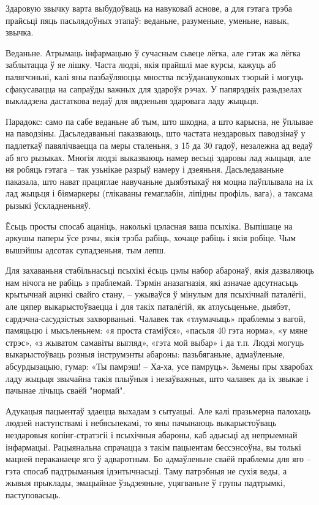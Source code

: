 Здаровую звычку варта выбудоўваць на навуковай аснове, а для гэтага трэба прайсьці пяць пасьлядоўных этапаў: веданьне, разуменьне, уменьне, навык, звычка.

Веданьне. Атрымаць інфармацыю ў сучасным сьвеце лёгка, але гэтак жа лёгка заблытацца ў яе лішку. Часта людзі, якія прайшлі мае курсы, кажуць аб палягчэньні, калі яны пазбаўляюцца мноства псэўданавуковых тэорый і могуць сфакусавацца на сапраўды важных для здароўя рэчах. У папярэдніх разьдзелах выкладзена дастаткова ведаў для вядзеньня здаровага ладу жыцьця.

Парадокс: само па сабе веданьне аб тым, што шкодна, а што карысна, не ўплывае на паводзіны. Дасьледаваньні паказваюць, што частата нездаровых паводзінаў у падлеткаў павялічваецца па меры сталеньня, з 15 да 30 гадоў, незалежна ад ведаў аб яго рызыках. Многія людзі выказваюць намер весьці здаровы лад жыцьця, але ня робяць гэтага – так узьнікае разрыў намеру і дзеяньня. Дасьледаваньне паказала, што нават працяглае навучаньне дыябэтыкаў ня моцна паўплывала на іх лад жыцьця і біямаркеры (глікаваны гемаглабін, ліпідны профіль, вага), а таксама рызыкі ўскладненьняў.

Ёсьць просты спосаб ацаніць, наколькі цэласная ваша псыхіка. Выпішаце на аркушы паперы ўсе рэчы, якія трэба рабіць, хочаце рабіць і якія робіце. Чым вышэйшы адсотак супадзеньня, тым лепш.

Для захаваньня стабільнасьці псыхікі ёсьць цэлы набор абаронаў, якія дазваляюць нам нічога не рабіць з праблемай. Тэрмін аназагназія, які азначае адсутнасьць крытычнай ацэнкі свайго стану, – ужываўся ў мінулым для псыхічнай паталёгіі, але цяпер выкарыстоўваецца і для такіх паталёгій, як атлусьценьне, дыябэт, сардэчна-сасудзістыя захворваньні. Чалавек так «тлумачыць» праблемы з вагой, памяцьцю і мысьленьнем: «я проста стаміўся», «пасьля 40 гэта норма», «у мяне стрэс», «з жыватом самавіты выгляд», «гэта мой выбар» і да т.п. Людзі могуць выкарыстоўваць розныя інструмэнты абароны: пазьбяганьне, адмаўленьне, абсурдызацыю, гумар: «Ты памрэш! – Ха-ха, усе памруць». Зьмены пры хваробах ладу жыцьця звычайна такія плыўныя і незаўважныя, што чалавек да іх звыкае і пачынае лічыць сваёй "нормай". 

Адукацыя пацыентаў здаецца выхадам з сытуацыі. Але калі празьмерна палохаць людзей наступствамі і небясьпекамі, то яны пачынаюць выкарыстоўваць нездаровыя копінг-стратэгіі і псыхічныя абароны, каб адысьці ад непрыемнай інфармацыі. Рацыянальна спрачацца з такім пацыентам бессэнсоўна, вы толькі мацней пераканаеце яго ў адваротным. Бо адмаўленьне сваёй праблемы для яго – гэта спосаб падтрыманьня ідэнтычнасьці. Таму патрэбныя не сухія веды, а жывыя прыклады, эмацыйнае ўзьдзеяньне, уцягваньне ў групы падтрымкі, паступовасьць.

